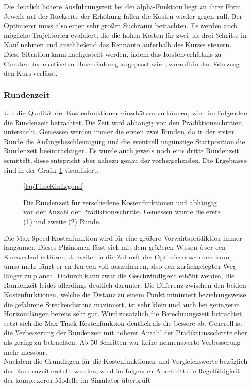 \documentclass{like}
\begin{document}
Die deutlich höhere Ausführungszeit bei der alpha-Funktion liegt an ihrer Form. Jeweils auf der Rückseite der Erhöhung fallen die Kosten wieder gegen null. Der Optimierer muss also einen sehr großen Suchraum betrachten. Es werden auch mögliche Trajektorien evaluiert, die die hohen Kosten für zwei bis drei Schritte in Kauf nehmen und anschließend das Rennauto außerhalb des Kurses steuern. Diese Situation kann nachgestellt werden, indem das Kostenverhältnis zu Gunsten der elastischen Beschränkung angepasst wird, woraufhin das Fahrzeug den Kurs verlässt. 

\subsubsection{Rundenzeit}
\label{laptime}
Um die Qualität der Kostenfunktionen einschätzen zu können, wird im Folgenden die Rundenzeit betrachtet. Die Zeit wird abhängig von den Prädiktionsschritten untersucht. Gemessen werden immer die ersten zwei Runden, da in der ersten Runde die Anfangs\-be\-schleu\-ni\-gung und die eventuell ungünstige Startposition die Rundenzeit beeinträchtigen. Es wurde auch jeweils noch eine dritte Rundenzeit ermittelt, diese entspricht aber nahezu genau der vorhergehenden. Die Ergebnisse sind in der Grafik \ref{fig:lapTimeKin} visualisiert.

\begin{figure}[ht!]
	\centering
	 
	\ref{lapTimeKinLegend}
	\caption{Die Rundenzeit für verschiedene Kostenfunktionen und abhängig von der Anzahl der Prädiktionsschritte. Gemessen wurde die erste (1) und zweite (2) Runde.}
	\label{fig:lapTimeKin}
\end{figure}

Die Max-Speed-Kostenfunktion wird für eine größere Vorwärtsprädiktion immer langsamer. Dieses Phänomen lässt sich mit dem größeren Wissen über den Kursverlauf erklären. Je weiter in die Zukunft der Optimierer schauen kann, umso mehr fängt er an  Kurven voll auszufahren, also den zurückgelegten Weg länger zu planen. Dadurch kann zwar die Geschwindigkeit erhöht werden, die Rundenzeit leidet allerdings deutlich darunter. 
Die Differenz zwischen den beiden Kostenfunktionen, welche die Distanz zu einem Punkt minimiert beziehungsweise die gefahrene Streckendistanz maximiert, ist sehr klein und auch bei geringeren Horizontlängen bereits sehr gut. Wird zusätzlich die Berechnungszeit betrachtet setzt sich die Max-Track Kostenfunktion deutlich als die bessere ab. Generell ist die Verbesserung der Rundenzeit mit höherer Anzahl der Prädiktionsschritte eher als gering zu betrachten. Ab 50 Schritten war keine nennenswerte Verbesserung mehr messbar. \\
Nachdem die Grundlagen für die Kostenfunktionen und Vergleichswerte bezüglich der Rundenzeit erstellt wurden, wird im folgenden Abschnitt die Regelfähigkeit der kom\-plex\-eren Modelle im Simulator überprüft.
\end{document}
